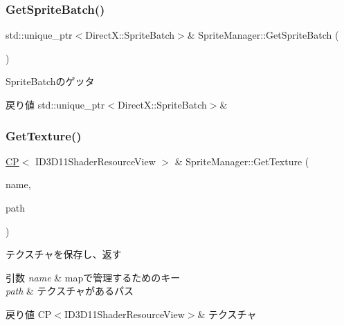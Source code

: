 \subsubsection{\texorpdfstring{Get\+Sprite\+Batch()}{GetSpriteBatch()}}
{\footnotesize\ttfamily std\+::unique\+\_\+ptr$<$Direct\+X\+::\+Sprite\+Batch$>$\& Sprite\+Manager\+::\+Get\+Sprite\+Batch (\begin{DoxyParamCaption}{ }\end{DoxyParamCaption})\hspace{0.3cm}{\ttfamily [inline]}}



Sprite\+Batchのゲッタ 

\begin{DoxyReturn}{戻り値}
std\+::unique\+\_\+ptr$<$\+Direct\+X\+::\+Sprite\+Batch$>$\& 
\end{DoxyReturn}
\mbox{\label{class_sprite_manager_abccd80013300704593a7bdc45aeeeb05}} 
\subsubsection{\texorpdfstring{Get\+Texture()}{GetTexture()}}
{\footnotesize\ttfamily \mbox{\hyperlink{sprite__manager_8h_ab0deadee9fd38132a17560766af7fc45}{CP}}$<$ I\+D3\+D11\+Shader\+Resource\+View $>$ \& Sprite\+Manager\+::\+Get\+Texture (\begin{DoxyParamCaption}\item[{std\+::string}]{name,  }\item[{W\+C\+H\+AR $\ast$}]{path }\end{DoxyParamCaption})}



テクスチャを保存し、返す 


\begin{DoxyParams}{引数}
{\em name} & mapで管理するためのキー \\
\hline
{\em path} & テクスチャがあるパス \\
\hline
\end{DoxyParams}
\begin{DoxyReturn}{戻り値}
C\+P$<$\+I\+D3\+D11\+Shader\+Resource\+View$>$\& テクスチャ 
\end{DoxyReturn}
\mbox{\label{class_sprite_manager_a82941ce284548c762f250220ea58f43c}} 
